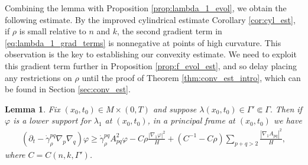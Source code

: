 \documentclass[12pt]{amsart}
\newtheorem{lemma}[theorem]{Lemma}
\begin{document}
Combining the lemma with Proposition \ref{prop:lambda_1_evol}, we obtain the following estimate. By the improved cylindrical estimate Corollary \ref{cor:cyl_est}, if $\rho$ is small relative to $n$ and $k$, the second gradient term in \eqref{eq:lambda_1_grad_terms} is nonnegative at points of high curvature. This observation is the key to establishing our convexity estimate. We need to exploit this gradient term further in Proposition \ref{prop:f_evol_est}, and so delay placing any restrictions on $\rho$ until the proof of Theorem \ref{thm:conv_est_intro}, which can be found in Section \ref{sec:conv_est}.

\begin{lemma}
\label{lem:lambda_1_grad_terms}
Fix $(x_0,t_0) \in M\times (0,T)$ and suppose $\lambda(x_0,t_0) \in \Gamma' \Subset \Gamma.$
Then if $\varphi$ is a lower support for $\lambda_1$ at $(x_0,t_0)$, in a principal frame at $(x_0,t_0)$ we have
\begin{align}
\label{eq:lambda_1_grad_terms}
(\partial_t - \dot \gamma_\rho^{pq} \nabla_p \nabla_q)\varphi \geq \dot \gamma_\rho^{pq} A^2_{pq}\varphi  - C \rho \frac{|\nabla_1 \varphi|^2}{H}   + (C^{-1} - C \rho ) \sum_{p+q> 2} \frac{|\nabla_1 A_{pq}|^2}{H} ,
\end{align} 
where $C = C(n,k,\Gamma')$. 
\end{lemma}
\end{document}
